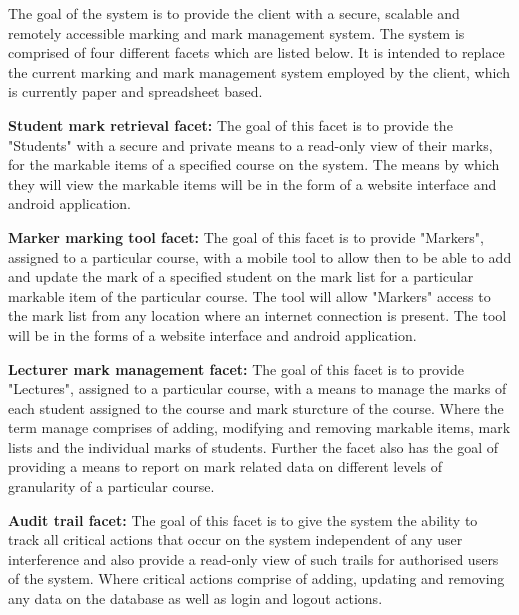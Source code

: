 \documentclass[12pt]{article}
\begin{document}
	The goal of the system is to provide the client with a secure, scalable and remotely accessible marking and mark management system. The system is comprised of four different facets which are listed below. It is intended to replace the current marking and mark management system employed by the client, which is currently paper and spreadsheet based.
	
	\vspace{0.5cm}
	\textbf{Student mark retrieval facet:}
	\vspace{0.1in}
	The goal of this facet is to provide the "Students" with a secure and private  means to a read-only view of their marks, for the markable items of a specified course on the system. The means by which they will view the markable items will be in the form of a website interface and android application.
	
	\vspace{0.5cm}
	\textbf{Marker marking tool facet:}
	\vspace{0.1in}
	The goal of this facet is to provide "Markers", assigned to a particular course, with a mobile tool to allow then to be able to add and update the mark of a specified student on the mark list for a particular markable item of the particular course. The tool will allow "Markers" access to the mark list from any location where an internet connection is present. The tool will be in the forms of a website interface and android application.   	
	
	\vspace{0.5cm}
	\textbf{Lecturer mark management facet:}
	\vspace{0.1in}
	The goal of this facet is to provide "Lectures", assigned to a particular course, with a means to manage the marks of each student assigned to the course and mark sturcture of the course. Where the term manage comprises of adding, modifying and removing markable items, mark lists and the individual marks of students. Further the facet also has the goal of providing a means to report on mark related data on different levels of granularity of a particular course.  
	
	\vspace{0.5cm}
	\textbf{Audit trail facet:}
	\vspace{0.1in}
	The goal of this facet is to give the system the ability to track all critical actions that occur on the system independent of any user interference and also provide a read-only view of such trails for authorised users of the system. Where critical actions comprise of adding, updating and removing any data on the database as well as login and logout actions.  
	
\end{document}

